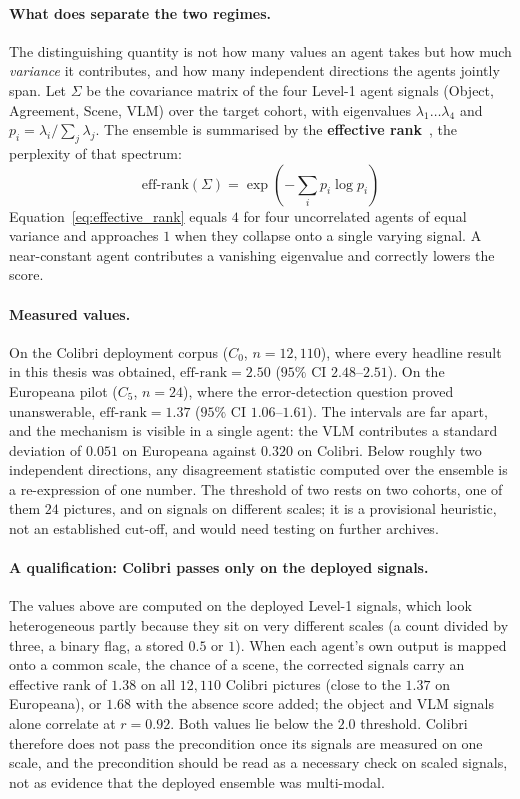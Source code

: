 \documentclass[12pt,a4paper]{report}
\begin{document}
\paragraph{What does separate the two regimes.} The distinguishing quantity is not how many values an agent takes but how much \emph{variance} it contributes, and how many independent directions the agents jointly span. Let $\Sigma$ be the covariance matrix of the four Level-1 agent signals (Object, Agreement, Scene, VLM) over the target cohort, with eigenvalues $\lambda_1 \dots \lambda_4$ and $p_i = \lambda_i / \sum_j \lambda_j$. The ensemble is summarised by the \textbf{effective rank}~\cite{roy2007effective}, the perplexity of that spectrum:
\begin{equation}
    \text{eff-rank}(\Sigma) = \exp\left(-\sum_{i} p_i \log p_i\right)
    \label{eq:effective_rank}
\end{equation}
Equation~\ref{eq:effective_rank} equals $4$ for four uncorrelated agents of equal variance and approaches $1$ when they collapse onto a single varying signal. A near-constant agent contributes a vanishing eigenvalue and correctly lowers the score.

\paragraph{Measured values.} On the Colibri deployment corpus ($C_0$, $n=12{,}110$), where every headline result in this thesis was obtained, $\text{eff-rank}=2.50$ ($95\%$ CI $2.48$--$2.51$). On the Europeana pilot ($C_5$, $n=24$), where the error-detection question proved unanswerable, $\text{eff-rank}=1.37$ ($95\%$ CI $1.06$--$1.61$). The intervals are far apart, and the mechanism is visible in a single agent: the VLM contributes a standard deviation of $0.051$ on Europeana against $0.320$ on Colibri. Below roughly two independent directions, any disagreement statistic computed over the ensemble is a re-expression of one number. The threshold of two rests on two cohorts, one of them $24$ pictures, and on signals on different scales; it is a provisional heuristic, not an established cut-off, and would need testing on further archives.

\paragraph{A qualification: Colibri passes only on the deployed signals.} The values above are computed on the deployed Level-1 signals, which look heterogeneous partly because they sit on very different scales (a count divided by three, a binary flag, a stored $0.5$ or $1$). When each agent's own output is mapped onto a common scale, the chance of a scene, the corrected signals carry an effective rank of $1.38$ on all $12{,}110$ Colibri pictures (close to the $1.37$ on Europeana), or $1.68$ with the absence score added; the object and VLM signals alone correlate at $r=0.92$. Both values lie below the $2.0$ threshold. Colibri therefore does not pass the precondition once its signals are measured on one scale, and the precondition should be read as a necessary check on scaled signals, not as evidence that the deployed ensemble was multi-modal.
\end{document}
